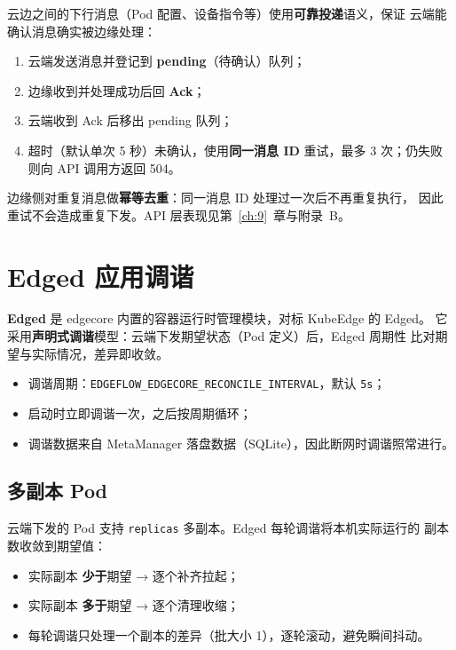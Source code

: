 云边之间的下行消息（Pod 配置、设备指令等）使用\textbf{可靠投递}语义，保证
云端能确认消息确实被边缘处理：

\begin{enumerate}
  \item 云端发送消息并登记到 \textbf{pending}（待确认）队列；
  \item 边缘收到并处理成功后回 \textbf{Ack}；
  \item 云端收到 Ack 后移出 pending 队列；
  \item 超时（默认单次 5 秒）未确认，使用\textbf{同一消息 ID} 重试，最多
        3 次；仍失败则向 API 调用方返回 504。
\end{enumerate}

边缘侧对重复消息做\textbf{幂等去重}：同一消息 ID 处理过一次后不再重复执行，
因此重试不会造成重复下发。API 层表现见第~\ref{ch:9}~章与附录~B。

\section{Edged 应用调谐}
\label{sec:5-edged}

\textbf{Edged} 是 edgecore 内置的容器运行时管理模块，对标 KubeEdge 的 Edged。
它采用\textbf{声明式调谐}模型：云端下发期望状态（Pod 定义）后，Edged 周期性
比对期望与实际情况，差异即收敛。

\begin{itemize}
  \item 调谐周期：\texttt{EDGEFLOW\_EDGECORE\_RECONCILE\_INTERVAL}，默认 \texttt{5s}；
  \item 启动时立即调谐一次，之后按周期循环；
  \item 调谐数据来自 MetaManager 落盘数据（SQLite），因此断网时调谐照常进行。
\end{itemize}

\subsection{多副本 Pod}

云端下发的 Pod 支持 \texttt{replicas} 多副本。Edged 每轮调谐将本机实际运行的
副本数收敛到期望值：

\begin{itemize}
  \item 实际副本 \textbf{少于}期望 → 逐个补齐拉起；
  \item 实际副本 \textbf{多于}期望 → 逐个清理收缩；
  \item 每轮调谐只处理一个副本的差异（批大小 1），逐轮滚动，避免瞬间抖动。
\end{itemize}


